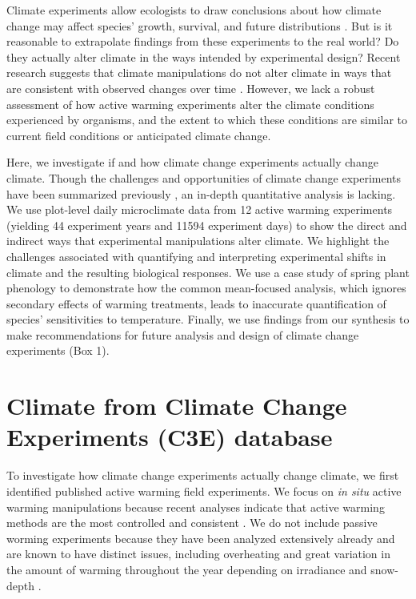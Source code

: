\documentclass{article}
\begin{document}
\par Climate experiments allow ecologists to draw conclusions about how climate change may affect species' growth, survival, and future distributions \citep{dukes1999,hobbie1999,morin2010,chuine2012,reich2015,gruner2017}. But is it reasonable to extrapolate findings from these experiments to the real world? Do they actually alter climate in the ways intended by experimental design? Recent research suggests that climate manipulations do not alter climate in ways that are consistent with observed changes over time \citep{wolkovich2012,menke2014}. However, we lack a robust assessment of how active warming experiments alter the climate conditions experienced by organisms, and the extent to which these conditions are similar to current field conditions or anticipated climate change. 

\par Here, we investigate if and how climate change experiments actually change climate. Though the challenges and opportunities of climate change experiments have been summarized previously \citep[e.g.,][]{deboeck2015}, an in-depth quantitative analysis is lacking. We use plot-level daily microclimate data from 12 active warming experiments (yielding 44 experiment years and 11594 experiment days) to show the direct and indirect ways that experimental manipulations alter climate. We highlight the challenges associated with quantifying and interpreting experimental shifts in climate and the resulting biological responses. We use a case study of spring plant phenology to demonstrate how the common mean-focused analysis, which ignores secondary effects of warming treatments, leads to inaccurate quantification of species' sensitivities to temperature. Finally, we use findings from our synthesis to make recommendations for future analysis and design of climate change experiments (Box 1). 

\section* {Climate from Climate Change Experiments (C3E) database}
\par To investigate how climate change experiments actually change climate, we first identified published active warming field experiments. We focus on \textit{in situ} active warming manipulations because recent analyses indicate that active warming methods are the most controlled and consistent \citep{kimball2005,kimball2008,aronson2009,wolkovich2012}. We do not include passive worming experiments because they have been analyzed extensively already and are known to have distinct issues, including overheating and great variation in the amount of warming throughout the year depending on irradiance and snow-depth \citep{marion1997,shaver2000,wolkovich2012,bokhorst2013}.
\end{document}
